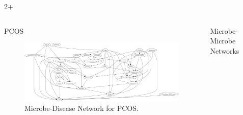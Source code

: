 \documentclass[final]{beamer}
\newlength{\sepwidth}
\newlength{\colwidth}
\newcommand{\separatorcolumn}{\begin{column}{\sepwidth}\end{column}}
\begin{document}
\begin{frame}[t]
\begin{columns}[t]
\begin{column}{\colwidth}
\end{column}

\separatorcolumn

\begin{column}{2\colwidth + \sepwidth}
  
  \begin{columns}[t]
      \begin{column}{\colwidth}
        \begin{block}{PCOS}
        \begin{figure}
          \centering
          \includegraphics[width=\linewidth]{../graphs/pcos/cdnod_norm.png}
          \caption{Microbe-Disease Network for PCOS.}
        \end{figure}
      \end{block}
      \end{column}
   
      
      \begin{column}{\colwidth}
        \begin{block}{Microbe-Microbe Networks}
        

\end{block}
\end{column}
\end{columns}
\end{column}
\end{columns}
\end{frame}
\end{document}
